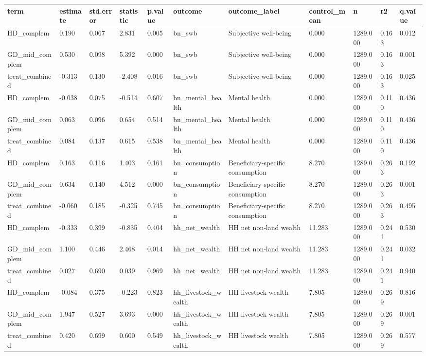 \begin{tabular}{lllllllllll}
\toprule
term & estimate & std.error & statistic & p.value & outcome & outcome\_label & control\_mean & n & r2 & q.value
 \\
\midrule
HD\_complem & 0.190 & 0.067 & 2.831 & 0.005 & bn\_swb & Subjective well-being & 0.000 & 1289.000 & 0.163 & 0.012 \\
GD\_mid\_complem & 0.530 & 0.098 & 5.392 & 0.000 & bn\_swb & Subjective well-being & 0.000 & 1289.000 & 0.163 & 0.001 \\
treat\_combined & -0.313 & 0.130 & -2.408 & 0.016 & bn\_swb & Subjective well-being & 0.000 & 1289.000 & 0.163 & 0.025 \\
HD\_complem & -0.038 & 0.075 & -0.514 & 0.607 & bn\_mental\_health & Mental health & 0.000 & 1289.000 & 0.110 & 0.436 \\
GD\_mid\_complem & 0.063 & 0.096 & 0.654 & 0.514 & bn\_mental\_health & Mental health & 0.000 & 1289.000 & 0.110 & 0.436 \\
treat\_combined & 0.084 & 0.137 & 0.615 & 0.538 & bn\_mental\_health & Mental health & 0.000 & 1289.000 & 0.110 & 0.436 \\
HD\_complem & 0.163 & 0.116 & 1.403 & 0.161 & bn\_consumption & Beneficiary-specific consumption & 8.270 & 1289.000 & 0.263 & 0.192 \\
GD\_mid\_complem & 0.634 & 0.140 & 4.512 & 0.000 & bn\_consumption & Beneficiary-specific consumption & 8.270 & 1289.000 & 0.263 & 0.001 \\
treat\_combined & -0.060 & 0.185 & -0.325 & 0.745 & bn\_consumption & Beneficiary-specific consumption & 8.270 & 1289.000 & 0.263 & 0.495 \\
HD\_complem & -0.333 & 0.399 & -0.835 & 0.404 & hh\_net\_wealth & HH net non-land wealth & 11.283 & 1289.000 & 0.241 & 0.530 \\
GD\_mid\_complem & 1.100 & 0.446 & 2.468 & 0.014 & hh\_net\_wealth & HH net non-land wealth & 11.283 & 1289.000 & 0.241 & 0.032 \\
treat\_combined & 0.027 & 0.690 & 0.039 & 0.969 & hh\_net\_wealth & HH net non-land wealth & 11.283 & 1289.000 & 0.241 & 0.940 \\
HD\_complem & -0.084 & 0.375 & -0.223 & 0.823 & hh\_livestock\_wealth & HH livestock wealth & 7.805 & 1289.000 & 0.269 & 0.816 \\
GD\_mid\_complem & 1.947 & 0.527 & 3.693 & 0.000 & hh\_livestock\_wealth & HH livestock wealth & 7.805 & 1289.000 & 0.269 & 0.001 \\
treat\_combined & 0.420 & 0.699 & 0.600 & 0.549 & hh\_livestock\_wealth & HH livestock wealth & 7.805 & 1289.000 & 0.269 & 0.577 \\

\end{tabular}
